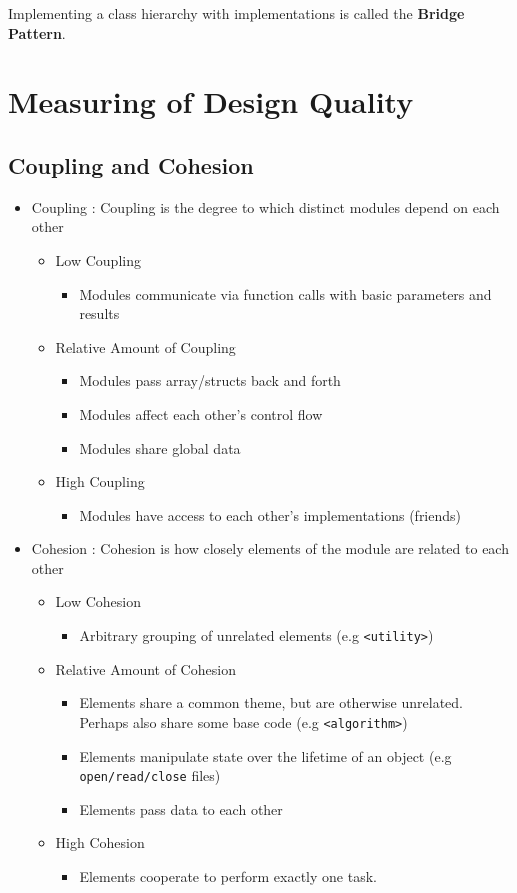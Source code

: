 \documentclass{article}
\begin{document}
Implementing a class hierarchy with implementations is called the \textbf{Bridge Pattern}.

\section{Measuring of Design Quality}
\subsection{Coupling and Cohesion }
\begin{itemize}
\item Coupling : Coupling is the degree to which distinct modules depend on each other 
\begin{itemize}
\item Low Coupling 
\begin{itemize}
\item Modules communicate via function calls with basic parameters and results
\end{itemize} 
\item Relative Amount of Coupling 
\begin{itemize}
\item Modules pass array/structs back and forth
\item Modules affect each other's control flow
\item Modules share global data
\end{itemize}
\item High Coupling
\begin{itemize}
\item Modules have access to each other's implementations (friends)
\end{itemize}
\end{itemize}


\item Cohesion : Cohesion is how closely elements of the module are related to each other 
\begin{itemize}
\item Low Cohesion 
\begin{itemize}
\item Arbitrary grouping of unrelated elements (e.g \verb|<utility>|) 
\end{itemize}
\item Relative Amount of Cohesion
\begin{itemize}
\item Elements share a common theme, but are otherwise unrelated. Perhaps also share some base code (e.g \verb|<algorithm>|)
\item Elements manipulate state over the lifetime of an object (e.g \verb|open/read/close| files)
\item Elements pass data to each other 
\end{itemize}
\item High Cohesion 
\begin{itemize}
\item Elements cooperate to perform exactly one task. 
\end{itemize}
\end{itemize}
\end{itemize}
\end{document}

